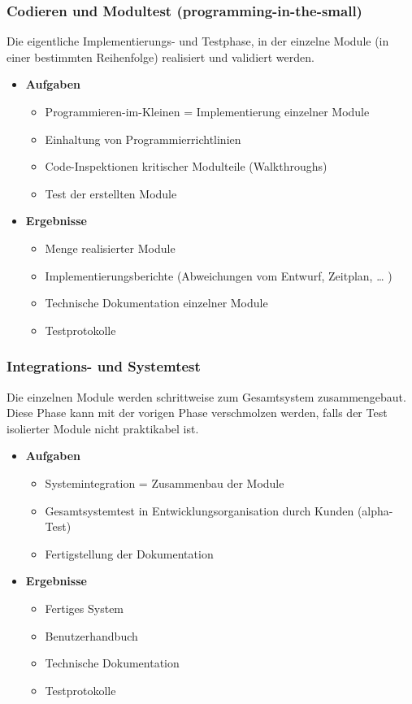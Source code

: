	\subsubsection{Codieren und Modultest (programming-in-the-small)}
	Die eigentliche Implementierungs- und Testphase, in der einzelne Module (in einer bestimmten Reihenfolge) realisiert und validiert werden.
	\begin{itemize}
		\item \textbf{Aufgaben}
		\begin{itemize}
			\item Programmieren-im-Kleinen = Implementierung einzelner Module
			\item Einhaltung von Programmierrichtlinien
			\item Code-Inspektionen kritischer Modulteile (Walkthroughs)
			\item Test der erstellten Module
		\end{itemize}
		\item \textbf{Ergebnisse}
		\begin{itemize}
			\item Menge realisierter Module
			\item Implementierungsberichte (Abweichungen vom Entwurf, Zeitplan, … )
			\item Technische Dokumentation einzelner Module
			\item Testprotokolle
		\end{itemize}
	\end{itemize}
	\subsubsection{Integrations- und Systemtest}
	Die einzelnen Module werden schrittweise zum Gesamtsystem zusammengebaut. Diese Phase kann mit der vorigen Phase verschmolzen werden, falls der Test isolierter Module nicht praktikabel ist.
	\begin{itemize}
		\item \textbf{Aufgaben}
		\begin{itemize}
			\item Systemintegration = Zusammenbau der Module
			\item Gesamtsystemtest in Entwicklungsorganisation durch Kunden (alpha-Test)
			\item Fertigstellung der Dokumentation
		\end{itemize}
		\item \textbf{Ergebnisse}
		\begin{itemize}
			\item Fertiges System
			\item Benutzerhandbuch
			\item Technische Dokumentation
			\item Testprotokolle
		\end{itemize}
	\end{itemize}
